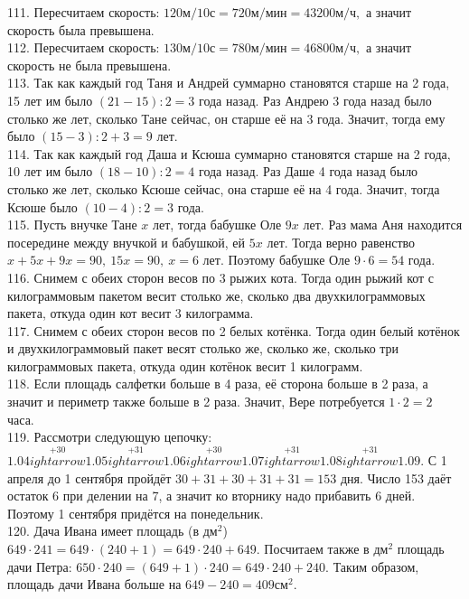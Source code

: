 111. Пересчитаем скорость: $120\text{м}/10\text{с}=720\text{м}/\text{мин}=43200\text{м}/\text{ч},$ а значит скорость была превышена.\\
112. Пересчитаем скорость: $130\text{м}/10\text{с}=780\text{м}/\text{мин}=46800\text{м}/\text{ч},$ а значит скорость не была превышена.\\
113. Так как каждый год Таня и Андрей суммарно становятся старше на 2 года, 15 лет им было $(21-15):2=3$ года назад. Раз Андрею 3 года назад было столько же лет, сколько Тане сейчас, он старше её на 3 года. Значит, тогда ему было $(15-3):2+3=9$ лет.\\
114. Так как каждый год Даша и Ксюша суммарно становятся старше на 2 года, 10 лет им было $(18-10):2=4$ года назад. Раз Даше 4 года назад было столько же лет, сколько Ксюше сейчас, она старше её на 4 года. Значит, тогда Ксюше было $(10-4):2=3$ года.\\
115. Пусть внучке Тане $x$ лет, тогда бабушке Оле $9x$ лет. Раз мама Аня находится посередине между внучкой и бабушкой, ей $5x$ лет. Тогда верно равенство $x+5x+9x=90,\ 15x=90,\ x=6$ лет. Поэтому бабушке Оле $9\cdot6=54$ года.\\
116. Снимем с обеих сторон весов по 3 рыжих кота. Тогда один рыжий кот с килограммовым пакетом весит столько же, сколько два двухкилограммовых пакета, откуда один кот весит 3 килограмма.\\
117. Снимем с обеих сторон весов по 2 белых котёнка. Тогда один белый котёнок и двухкилограммовый пакет весят столько же, сколько же, сколько три килограммовых пакета, откуда один котёнок весит 1 килограмм.\\
118. Если площадь салфетки больше в 4 раза, её сторона больше в 2 раза, а значит и периметр также больше в 2 раза. Значит, Вере потребуется $1\cdot2=2$ часа.\\
119. Рассмотри следующую цепочку: $1.04\stackrel{+30}{
ightarrow}1.05\stackrel{+31}{
ightarrow}1.06\stackrel{+30}{
ightarrow}1.07\stackrel{+31}{
ightarrow}1.08\stackrel{+31}{
ightarrow}1.09.$
С 1 апреля до 1 сентября пройдёт $30+31+30+31+31=153$ дня. Число 153 даёт остаток 6 при делении на 7, а значит ко вторнику надо прибавить 6 дней. Поэтому 1 сентября придётся на понедельник.\\
120. Дача Ивана имеет площадь (в $\text{дм}^2$) $649\cdot241=649\cdot(240+1)=649\cdot240+649.$ Посчитаем также в $\text{дм}^2$ площадь дачи Петра:
$650\cdot240=(649+1)\cdot240=649\cdot240+240.$ Таким образом, площадь дачи Ивана больше на $649-240=409\text{см}^2.$\\
